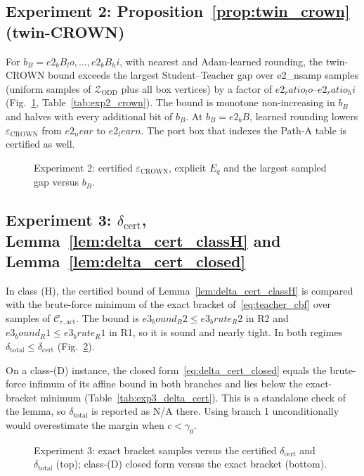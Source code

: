 \subsection{Experiment 2: Proposition~\ref{prop:twin_crown} (twin-CROWN)}
For \(b_B = {{e2_bB_lo}},\dots,{{e2_bB_hi}}\), with nearest and Adam-learned rounding, the twin-CROWN bound exceeds the
largest Student--Teacher gap over {{e2_nsamp}} samples (uniform samples of \(\mathcal Z_{\mathrm{ODD}}\) plus all box
vertices) by a factor of \({{e2_ratio_lo}}\)--\({{e2_ratio_hi}}\) (Fig.~\ref{fig:exp2}, Table~\ref{tab:exp2_crown}).
The bound is monotone non-increasing in \(b_B\) and halves with every additional bit of \(b_B\). At \(b_B = {{e2_bB}}\), learned rounding
lowers \(\varepsilon_{\mathrm{CROWN}}\) from \({{e2_near}}\) to \({{e2_learn}}\). The port box that indexes the Path-A
table is certified as well.


\begin{figure}[t]\centering{}
\caption{Experiment 2: certified \(\varepsilon_{\mathrm{CROWN}}\), explicit \(E_q\) and the largest sampled gap versus \(b_B\).}\label{fig:exp2}\end{figure}

\subsection{Experiment 3: \(\delta_{\mathrm{cert}}\), Lemma~\ref{lem:delta_cert_classH} and Lemma~\ref{lem:delta_cert_closed}}
In class (H), the certified bound of Lemma~\ref{lem:delta_cert_classH} is compared with the brute-force minimum of the
exact bracket of~\eqref{eq:teacher_cbf} over samples of \(\mathcal C_{r,\mathrm{act}}\). The bound is
\({{e3_bound_R2}} \le {{e3_brute_R2}}\) in R2 and \({{e3_bound_R1}} \le {{e3_brute_R1}}\) in R1, so it is sound and nearly
tight. In both regimes \(\delta_{\mathrm{total}} \le \delta_{\mathrm{cert}}\) (Fig.~\ref{fig:exp3}).

On a class-(D) instance, the closed form~\eqref{eq:delta_cert_closed} equals the brute-force infimum of its affine bound
in both branches and lies below the exact-bracket minimum (Table~\ref{tab:exp3_delta_cert}). This is a standalone check
of the lemma, so \(\delta_{\mathrm{total}}\) is reported as N/A there. Using branch 1 unconditionally would overestimate
the margin when \(c < \gamma_0\).

\begin{figure}[t]\centering{}
\caption{Experiment 3: exact bracket samples versus the certified \(\delta_{\mathrm{cert}}\) and \(\delta_{\mathrm{total}}\) (top);
class-(D) closed form versus the exact bracket (bottom).}\label{fig:exp3}\end{figure}


